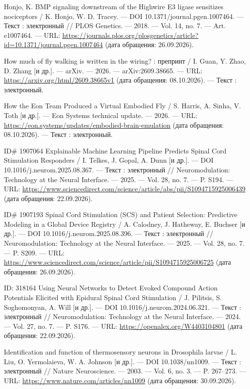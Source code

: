 \begin{list}{}{\setlength{\leftmargin}{10mm}\setlength{\labelwidth}{8mm}\setlength{\labelsep}{2mm}\setlength{\itemsep}{0pt}\setlength{\parsep}{0pt}\setlength{\topsep}{0pt}}
\item[151.] Honjo, K. BMP signaling downstream of the Highwire E3 ligase sensitizes nociceptors / K. Honjo, W. D. Tracey. — DOI 10.1371/journal.pgen.1007464. — Текст : электронный // PLOS Genetics. — 2018. — Vol. 14, no. 7. — Art. e1007464. — URL: \url{https://journals.plos.org/plosgenetics/article?id=10.1371/journal.pgen.1007464} (дата обращения: 26.09.2026).
\item[152.] How much of fly walking is written in the wiring? : препринт / I. Guan, Y. Zhao, D. Zhang [и др.]. — arXiv. — 2026. — arXiv:2609.38665. — URL: \url{https://arxiv.org/html/2609.38665v1} (дата обращения: 08.10.2026). — Текст : электронный.
\item[153.] How the Eon Team Produced a Virtual Embodied Fly / S. Harris, A. Sinha, V. Toth [и др.]. — Eon Systems technical update. — 2026. — URL: \url{https://eon.systems/updates/embodied-brain-emulation} (дата обращения: 08.10.2026). — Текст : электронный.
\item[154.] ID\# 1907064 Explainable Machine Learning Pipeline Predicts Spinal Cord Stimulation Responders / I. Telkes, J. Gopal, A. Dunn [и др.]. — DOI 10.1016/j.neurom.2025.08.367. — Текст : электронный // Neuromodulation: Technology at the Neural Interface. — 2025. — Vol. 28, no. 7. — P. S194. — URL: \url{https://www.sciencedirect.com/science/article/abs/pii/S1094715925006439} (дата обращения: 22.09.2026).
\item[155.] ID\# 1907193 Spinal Cord Stimulation (SCS) and Patient Selection: Predictive Modeling in a Global Device Registry / A. Calodney, J. Hatheway, E. Buchser [и др.]. — DOI 10.1016/j.neurom.2025.08.396. — Текст : электронный // Neuromodulation: Technology at the Neural Interface. — 2025. — Vol. 28, no. 7. — P. S209. — URL: \url{https://www.sciencedirect.com/science/article/pii/S1094715925006725} (дата обращения: 26.09.2026).
\item[156.] ID: 318164 Using Neural Networks to Detect Evoked Compound Action Potentials Elicited with Epidural Spinal Cord Stimulation / J. Pilitsis, S. Soghomonyan, A. Will [и др.]. — DOI 10.1016/j.neurom.2024.06.321. — Текст : электронный // Neuromodulation: Technology at the Neural Interface. — 2024. — Vol. 27, no. 7. — P. S176. — URL: \url{https://openalex.org/W4403104801} (дата обращения: 22.09.2026).
\item[157.] Identification and function of thermosensory neurons in Drosophila larvae / L. Liu, O. Yermolaieva, W. A. Johnson [и др.]. — DOI 10.1038/nn1009. — Текст : электронный // Nature Neuroscience. — 2003. — Vol. 6, no. 3. — P. 267–273. — URL: \url{https://www.nature.com/articles/nn1009} (дата обращения: 30.09.2026).

\end{list}
